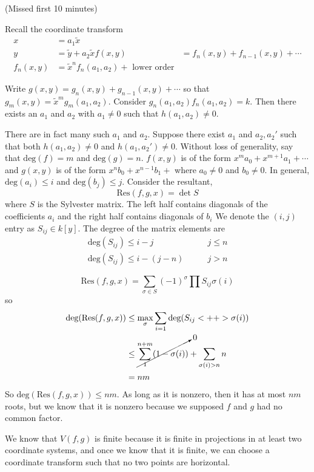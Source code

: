 \documentclass[a4paper,twoside,master.tex]{subfiles}
\begin{document}


(Missed first 10 minutes)

Recall the coordinate transform
\begin{align}
    x &= a_1 \tilde{x} \\
    y &= \tilde{y} + a_2 \tilde{x}
    f(x,y) &= f_n(x,y) + f_{n-1}(x, y) + \cdots \\
    f_n(x, y) &= \tilde{x}^{n} f_n(a_1, a_2) + \text{ lower order}
\end{align}

Write $ g(x,y) = g_n(x,y) + g_{n-1}(x,y) + \cdots $ so that $ g_m(x,y) = \tilde{x}^m g_m(a_1, a_2) $. Consider $ g_n(a_1, a_2) f_n(a_1, a_2) = k $. Then there exists an $ a_1 $ and $ a_2 $ with $ a_1 \neq 0 $ such that $ h(a_1, a_2) \neq 0 $.

There are in fact many such $ a_1 $ and $ a_2 $. Suppose there exist $ a_1 $ and $ a_2, a_2' $ such that both $ h(a_1, a_2) \neq 0 $ and $ h(a_1, a_2') \neq 0 $. Without loss of generality, say that $ \text{deg}(f) = m $ and $ \text{deg}(g) = n $. $ f(x,y) $ is of the form $ x^m a_0 + x^{m+1} a_1 + \cdots $ and $ g(x,y) $ is of the form $ x^n b_0 + x^{n-1} b_1 + $ where $ a_0 \neq 0 $ and $ b_0 \neq 0 $. In general, $ \text{deg}(a_i) \leq i $ and $ \text{deg}(b_j) \leq j $. Consider the resultant,
\begin{equation}
    \text{Res}(f,g,x) = \det S
\end{equation}
where $ S $ is the Sylvester matrix. The left half contains diagonals of the coefficients $ a_i $ and the right half contains diagonals of $ b_i $ We denote the $ (i,j) $ entry as $ S_{ij} \in k[y] $. The degree of the matrix elements are
\begin{align}
    \text{deg}(S_{ij}) \leq i - j &\qquad j \leq n \\
    \text{deg}(S_{ij}) \leq i - (j - n) &\qquad j > n
\end{align}

\begin{equation}
    \text{Res}(f,g,x) = \sum_{\sigma \in S} (-1)^{\sigma} \prod S_{ij} \sigma(i)
\end{equation}
so
\begin{align}
    \text{deg}(\text{Res}(f,g,x)) &\leq \max_{\sigma} \sum_{i=1} \text{deg}(S_{ij} <++> \sigma(i)) \\
                                  &\leq \cancelto{0}{\sum^{n+m}_{1} (1 - \sigma(i))} + \sum_{\sigma(i) > n} n \\
                                  &= nm
\end{align}
So $ \text{deg}(\text{Res}(f,g,x)) \leq nm $. As long as it is nonzero, then it has at most $ nm $ roots, but we know that it is nonzero because we supposed $ f $ and $ g $ had no common factor.

We know that $ V(f,g) $ is finite because it is finite in projections in at least two coordinate systems, and once we know that it is finite, we can choose a coordinate transform such that no two points are horizontal.
\end{document}
